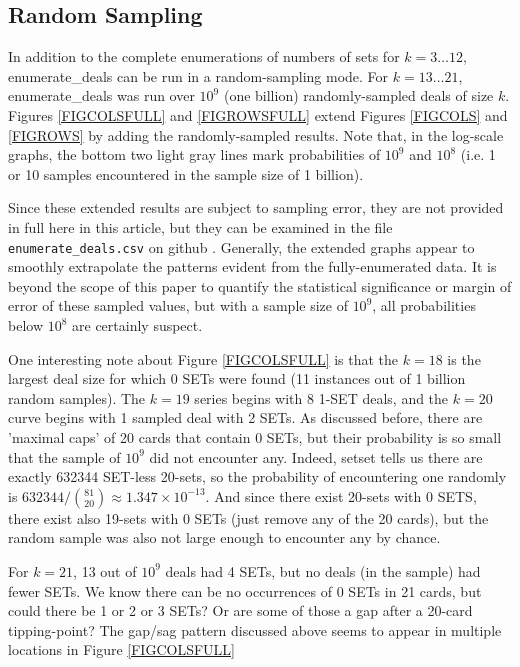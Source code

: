 \documentclass[10pt]{amsart}
\newcommand{\SETSETb}{{\sc setset }}
\newcommand{\EDb}{{\sc enumerate\_deals }}
\begin{document}
\subsection{Random Sampling}
In addition to the complete enumerations of numbers of sets for $k=3\ldots 12$,
\EDb can be run in a random-sampling mode. For $k=13\ldots 21$, \EDb was run
over $10^9$ (one billion) randomly-sampled deals of size $k$. Figures
\ref{FIGCOLSFULL} and \ref{FIGROWSFULL} extend Figures \ref{FIGCOLS} and
\ref{FIGROWS} by adding the randomly-sampled results. Note that, in the
log-scale graphs, the bottom two light gray lines mark probabilities of $10^9$
and $10^8$ (i.e. 1 or 10 samples encountered in the sample size of 1 billion).

Since these extended results are subject to sampling error, they are not
provided in full here in this article, but they can be examined in the file {\tt
  enumerate\_deals.csv} on github \cite{ME}. Generally, the extended graphs
appear to smoothly extrapolate the patterns evident from the fully-enumerated
data. It is beyond the scope of this paper to quantify the statistical
significance or margin of error of these sampled values, but with a sample size
of $10^9$, all probabilities below $10^8$ are certainly suspect.

One interesting note about Figure \ref{FIGCOLSFULL} is that the $k=18$ is the
largest deal size for which 0 SETs were found (11 instances out of 1 billion
random samples). The $k=19$ series begins with 8 1-SET deals, and the $k=20$
curve begins with 1 sampled deal with 2 SETs. As discussed before, there are
'maximal caps' of 20 cards that contain 0 SETs, but their probability is so
small that the sample of $10^9$ did not encounter any. Indeed, \SETSETb tells us
there are exactly 632344 SET-less 20-sets, so the probability of encountering one
randomly is $632344/\binom{81}{20}\approx1.347\times 10^{-13}$. And since there
exist 20-sets with 0 SETS, there exist also 19-sets with 0 SETs (just remove any
of the 20 cards), but the random sample was also not large enough to encounter
any by chance.

For $k=21$, 13 out of $10^9$ deals had 4 SETs, but no deals (in the sample) had
fewer SETs. We know there can be no occurrences of 0 SETs in 21 cards, but could
there be 1 or 2 or 3 SETs? Or are some of those a gap after a 20-card
tipping-point? The gap/sag pattern discussed above seems to appear in multiple
locations in Figure \ref{FIGCOLSFULL}
\end{document}
